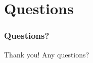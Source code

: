 \section*{Questions}
\begin{frame}
   \frametitle{Questions?}
   Thank you!\newline	
   Any questions?
\end{frame}
